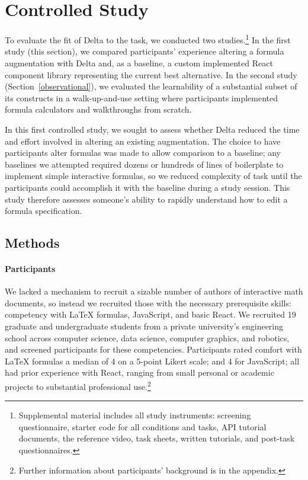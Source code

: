 \section{Controlled Study}\label{results}

To evaluate the fit of Delta to the task, we conducted two studies.\footnote{Supplemental material includes all study instruments: screening questionnaire, starter code for all conditions and tasks, API tutorial documents, the reference video, task sheets, written tutorials, and post-task questionnaires.} In the first study (this section), we compared participants' experience altering a formula augmentation with Delta and, as a baseline, a custom implemented React component library representing the current best alternative. In the second study (Section~\ref{observational}), we evaluated the learnability of a substantial subset of its constructs in a walk-up-and-use setting where participants implemented formula calculators and walkthroughs from scratch.

In this first controlled study, we sought to assess whether Delta reduced the time and effort involved in altering an existing augmentation. The choice to have participants alter formulas was made to allow comparison to a baseline; any baselines we attempted required dozens or hundreds of lines of boilerplate to implement simple interactive formulas, so we reduced complexity of task until the participants could accomplish it with the baseline during a study session. This study therefore assesses someone's ability to rapidly understand how to edit a formula specification.

\subsection{Methods}

\paragraph{Participants} We lacked a mechanism to recruit a sizable number of authors of interactive math documents, so instead we recruited those with the necessary prerequisite skills: competency with LaTeX formulas, JavaScript, and basic React. We recruited 19 graduate and undergraduate students from a private university's engineering school across computer science, data science, computer graphics, and robotics, and screened participants for these competencies. Participants rated comfort with LaTeX formulas a median of 4 on a 5-point Likert scale; and 4 for JavaScript; all had prior experience with React, ranging from small personal or academic projects to substantial professional use.\footnote{Further information about participants' background is in the appendix.}

